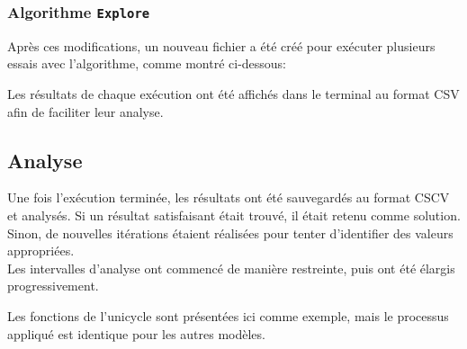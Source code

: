 \documentclass[../CSC_5RO16_TA_TP3.tex]{subfiles}
\begin{document}
\subsubsection{Algorithme \texttt{Explore}}
\noindent Après ces modifications, un nouveau fichier a été créé pour exécuter plusieurs essais avec l'algorithme, comme montré ci-dessous:

\begin{scriptsize}\mycode
    
\end{scriptsize}
Les résultats de chaque exécution ont été affichés dans le terminal au format CSV afin de faciliter leur analyse.


\subsection{Analyse}
\noindent Une fois l'exécution terminée, les résultats ont été sauvegardés au format CSCV et analysés. Si un résultat satisfaisant était trouvé, il était retenu comme solution. Sinon, de nouvelles itérations étaient réalisées pour tenter d'identifier des valeurs appropriées.\\

\noindent Les intervalles d'analyse ont commencé de manière restreinte, puis ont été élargis progressivement.

\begin{remark}
    Les fonctions de l'unicycle sont présentées ici comme exemple, mais le processus appliqué est identique pour les autres modèles.
\end{remark}
\end{document}
